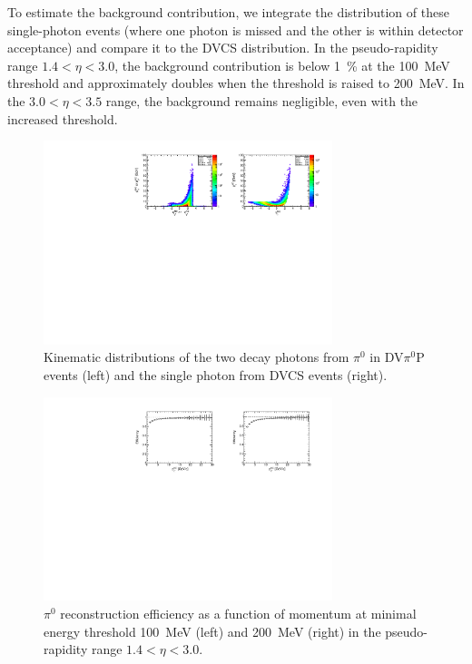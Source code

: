 \documentclass[letterpaper,12pt]{article}
\begin{document}
To estimate the background contribution, we integrate the distribution of these single-photon events (where one photon is missed and the other is within detector acceptance) and compare it to the DVCS distribution. In the pseudo-rapidity range $1.4 < \eta < 3.0$, the background contribution is below 1~\% at the 100~MeV threshold and approximately doubles when the threshold is raised to 200~MeV. In the $3.0 < \eta < 3.5$ range, the background remains negligible, even with the increased threshold.

\begin{figure}[h]
    \centering
    \includegraphics[width=0.75\textwidth]{Figures/Pi0GammaDVCSGamma.pdf}
    \caption{Kinematic distributions of the two decay photons from $\pi^{0}$ in DV$\pi^{0}$P events (left) and the single photon from DVCS events (right).}
\label{fig:pi0_and_dvcs}
\end{figure}

\begin{figure}[h]
    \centering
    \includegraphics[width=0.75\textwidth]{Figures/hPi0ThresholdRatio.pdf}
    \caption{$\pi^{0}$ reconstruction efficiency as a function of momentum at minimal energy threshold 100~MeV (left) and 200~MeV (right) in the pseudo-rapidity range $1.4 < \eta < 3.0$.}
\label{fig:pi0_threshold_ratio}
\end{figure}
\end{document}
